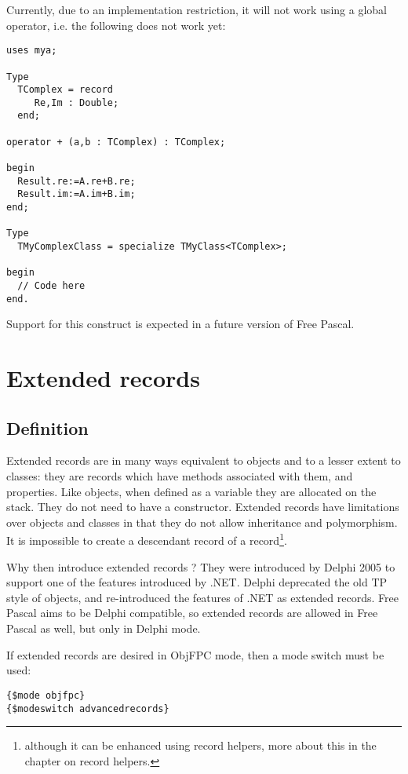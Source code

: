 Currently, due to an implementation restriction, it will not work using a global operator, i.e. the following does not work yet:
\begin{verbatim}
uses mya;

Type
  TComplex = record
     Re,Im : Double;
  end;

operator + (a,b : TComplex) : TComplex;

begin
  Result.re:=A.re+B.re;
  Result.im:=A.im+B.im;
end;

Type
  TMyComplexClass = specialize TMyClass<TComplex>;

begin
  // Code here
end.
\end{verbatim}
Support for this construct is expected in a future version of Free Pascal.


\chapter{Extended records}
\label{ch:ExtendedRecords}

\section{Definition}
Extended records are in many ways equivalent to objects and to a lesser
extent to classes: they are records which have methods associated with 
them, and properties. Like objects, when defined as a variable they are 
allocated on the stack. They do not need to have a constructor.
Extended records have limitations over objects and classes in that they 
do not allow inheritance and polymorphism. It is impossible to create a
descendant record of a record\footnote{although it can be enhanced using record
helpers, more about this in the chapter on record helpers.}.

Why then introduce extended records ? They were introduced by Delphi 
2005 to support one of the features introduced by .NET. Delphi deprecated
the old TP style of objects, and re-introduced the features of .NET as 
extended records. Free Pascal aims to be Delphi 
compatible, so extended records are allowed in Free Pascal as well, 
but only in Delphi mode.

If extended records are desired in ObjFPC mode, then a mode switch must be
used:
\begin{verbatim}
{$mode objfpc}
{$modeswitch advancedrecords}
\end{verbatim}

